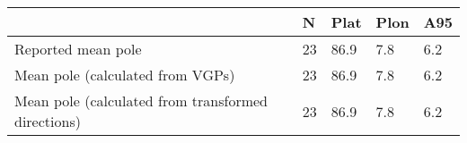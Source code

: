 \begin{tabular}{lllll}
\toprule
{} &   N &  Plat & Plon &  A95 \\
\midrule
Reported mean pole                                 &  23 &  86.9 &  7.8 &  6.2 \\
Mean pole (calculated from VGPs)                   &  23 &  86.9 &  7.8 &  6.2 \\
Mean pole (calculated from transformed directions) &  23 &  86.9 &  7.8 &  6.2 \\
\bottomrule
\end{tabular}
